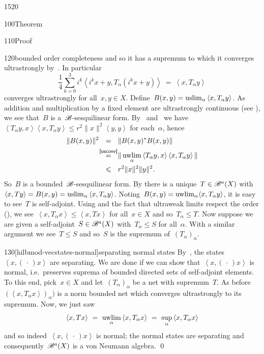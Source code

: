 \begin{parsec}{1520}
\begin{point}{100}{Theorem}
\begin{point}{110}{Proof}
\begin{point}{120}{bounded order completeness}
    and so it has a supremum to which
    it converges ultrastrongly by~.
In particular
\begin{equation*}
\frac{1}{4} \sum^3_{k=0} i^k \left< i^kx+y, T_\alpha(i^k x+y)\right>
    \ =\  \left<x, T_\alpha y\right>
\end{equation*}
converges ultrastrongly for all~$x,y \in X$.
Define~$B(x,y) = \uslim_\alpha \left<x,T_\alpha y\right>$.
As addition and multiplication by a fixed element are
    ultrastrongly continuous (see ),
    we see that~$B$ is a~$\mathscr{B}$-sesquilinear form.
By~ and~
    we have~$\left<T_\alpha y, x\right>\left<x, T_\alpha y\right>
        \leq r^2 \|x\|^2 \left<y,y\right>$
    for each~$\alpha$, hence
\begin{align*}
    \| B(x,y) \|^2 &\ \ = \ \ 
    \| B(x,y)^* B(x,y) \| \\
    &\ \ \overset{\mathclap{\sref{usconv}}}{=} \ \ \| \uwlim_\alpha \left<T_\alpha y, x\right>\left< x, T_\alpha y\right>\| \\
    &\ \ \leq \ \  r^2 \|x\|^2 \|y\|^2.
\end{align*}
So~$B$ is a bounded~$\mathscr{B}$-sesquilinear form.
By 
    there is a unique~$T \in \mathscr{B}^a(X)$
    with~$\left<x,Ty\right> = B(x,y) = \uslim_\alpha \left<x,T_\alpha y\right>$.
Noting~$B(x,y) = \uwlim_\alpha \langle x, T_\alpha y \rangle$,
    it is easy to see~$T$ is self-adjoint.
Using  and 
the fact that ultraweak limits respect the order (),
    we see~$\left<x,T_\alpha x\right> \leq \left<x,T x\right>$
    for all~$x \in X$ and so~$T_\alpha \leq T$.
Now suppose we are given a self-adjoint~$S \in \mathscr{B}^a(X)$
    with~$T_\alpha \leq S$ for all~$\alpha$.
With a similar argument we see~$T \leq S$ and so~$S$ is
    the supremum of~$(T_\alpha)_\alpha$.
\end{point}
\begin{point}{130}[hilbmod-vecstates-normal]{separating normal states}%
By~\sref{hilbmod-ordersep},
    the states~$\left<x,(\,\cdot\,)x\right>$
    are separating.
We are done if we can show that~$\left<x,(\,\cdot\,)x\right>$
    is normal, i.e.~preserves suprema of bounded directed sets of
    self-adjoint elements.
To this end, pick~$x \in X$ and let~$(T_\alpha)_\alpha$
    be a net with supremum~$T$.
As before~$(\left<x,T_\alpha x\right>)_\alpha)$
    is a norm bounded net which converges ultrastrongly to its
    supremum.
Now, we just saw
\begin{equation*}
    \left<x,Tx\right> \ =\  \uwlim_\alpha \left<x, T_\alpha x\right>
               \  =\  \sup_\alpha \left<x, T_\alpha x\right>
\end{equation*}
and so indeed~$\left<x, (\,\cdot\,)x\right>$ is normal;
the normal states are separating
and consequently~$\mathscr{B}^a(X)$ is a von Neumann algebra. \qed
\end{point}
\end{point}
\end{point}
\end{parsec}


